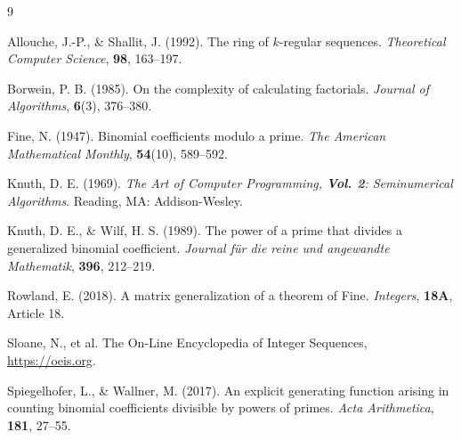 \documentclass{amsart}
\theoremstyle{definition}
\begin{document}
\begin{thebibliography}{9}

Allouche, J.-P., \& Shallit, J. (1992). The ring of $ k $-regular sequences. \textit{Theoretical Computer Science}, \textbf{98}, 163--197.

Borwein, P. B. (1985). On the complexity of calculating factorials. \textit{Journal of Algorithms}, \textbf{6}(3), 376--380. 

Fine, N. (1947). Binomial coefficients modulo a prime. \textit{The American Mathematical Monthly}, \textbf{54}(10), 589--592.

Knuth, D. E. (1969). \textit{The Art of Computer Programming, \textbf{Vol. 2}: Seminumerical Algorithms}. Reading, MA: Addison-Wesley.

Knuth, D. E., \& Wilf, H. S. (1989). The power of a prime that divides a generalized binomial coefficient. \textit{Journal für die reine und angewandte Mathematik}, \textbf{396}, 212--219. 

Rowland, E. (2018). A matrix generalization of a theorem of Fine. \textit{Integers}, \textbf{18A}, Article 18.

Sloane, N., et al.
The On-Line Encyclopedia of Integer Sequences,
\url{https://oeis.org}.

Spiegelhofer, L., \& Wallner, M. (2017). An explicit generating function arising in counting binomial coefficients divisible by powers of primes. \textit{Acta Arithmetica}, \textbf{181}, 27--55.
\end{thebibliography}
\end{document}

